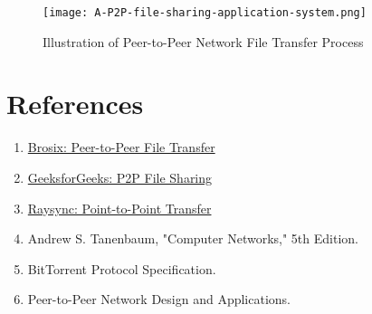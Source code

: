 \documentclass[12pt,a4paper]{article}
\begin{document}
\begin{figure}[H]
    \centering
    \texttt{[image: A-P2P-file-sharing-application-system.png]}
    \caption{Illustration of Peer-to-Peer Network File Transfer Process}
    \label{fig:p2p-transfer}
\end{figure}

\section{References}

\begin{enumerate}
    \item \href{https://www.brosix.com/blog/peer-peer-file-transfer/}{Brosix: Peer-to-Peer File Transfer}
    \item \href{https://www.geeksforgeeks.org/p2p-peer-to-peer-file-sharing/}{GeeksforGeeks: P2P File Sharing}
    \item \href{https://www.raysync.io/news/everything-you-need-to-know-about-point-to-point-transfer/}{Raysync: Point-to-Point Transfer}
    \item Andrew S. Tanenbaum, "Computer Networks," 5th Edition.
    \item BitTorrent Protocol Specification.
    \item Peer-to-Peer Network Design and Applications.
\end{enumerate}
\end{document}
